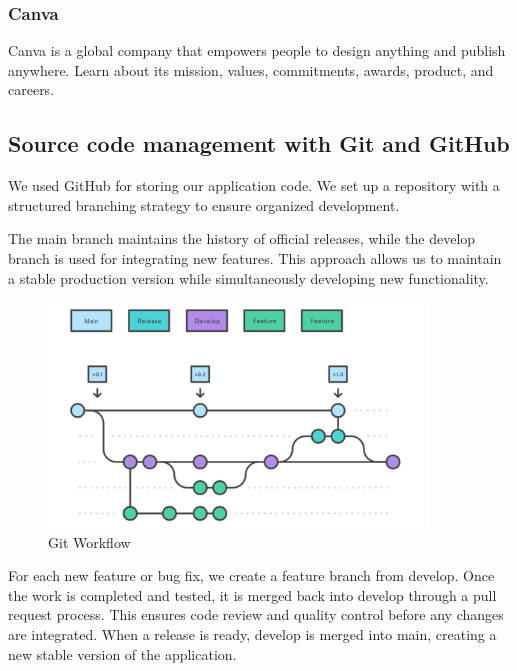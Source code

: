 \subsubsection*{\protect{} Canva}

Canva is a global company that empowers people to design anything and publish anywhere. Learn about its mission, values, commitments, awards, product, and careers.

\subsection{Source code management with Git and GitHub}

We used GitHub \cite{GithubWebsite} for storing our application code. We set up a repository with a structured branching strategy to ensure organized development.
\newpage

The main branch maintains the history of official releases, while the develop branch is used for integrating new features. This approach allows us to maintain a stable production version while simultaneously developing new functionality.

\begin{figure}[ht!]
    \centering
    \includegraphics[width=0.9\textwidth]{images/gitWorkflow.png}
    \caption{Git Workflow}
    \label{fig:git-workflow}
\end{figure}

For each new feature or bug fix, we create a feature branch from develop. Once the work is completed and tested, it is merged back into develop through a pull request process. This ensures code review and quality control before any changes are integrated. When a release is ready, develop is merged into main, creating a new stable version of the application.

